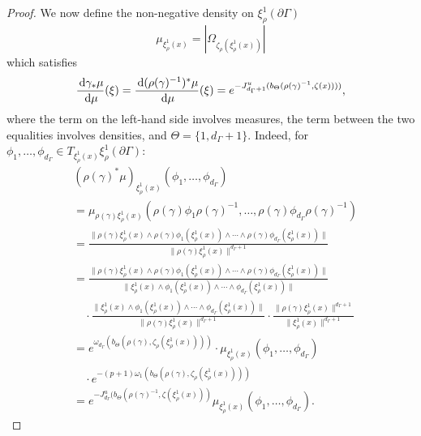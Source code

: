 \documentclass{report}
\begin{document}
\begin{proof}
    We now define the non-negative density on $\xi_\rho^1(\partial \Gamma)$
    \[
        \mu_{\xi_\rho^1(x)} = |\Omega_{\zeta_\rho(\xi_\rho^1(x))}|
    \]
    which satisfies
    \[
        \frac{\,\mathrm{d} \gamma_*\mu}{\,\mathrm{d}\mu}(\xi) = \frac{\,\mathrm{d} (\rho(\gamma)^{-1})^*\mu}{\,\mathrm{d}\mu}(\xi) =
        e^{-J^u_{d_\Gamma + 1}(b_\Theta(\rho(\gamma)^{-1}, \zeta(x))))},
    \]
    where the term on the left-hand side involves measures, the term between the two equalities involves densities, and $\Theta = \{1, d_\Gamma + 1\}$.
    Indeed, for $\phi_1, \ldots, \phi_{d_\Gamma} \in T_{\xi_\rho^1(x)}\xi_\rho^1(\partial \Gamma)$:
    \begin{align*}
        &(\rho(\gamma)^*\mu)_{\xi_\rho^1(x)} (\phi_1, \ldots, \phi_{d_\Gamma})\\
        &=
        \mu_{\rho(\gamma)\xi_\rho^1(x)} (\rho(\gamma)\phi_1\rho(\gamma)^{-1}, \ldots, \rho(\gamma)\phi_{d_\Gamma} \rho(\gamma)^{-1}) \\
        &=
        \frac{\|\rho(\gamma) \xi_\rho^1(x) \wedge \rho(\gamma) \phi_1(\xi_\rho^1(x)) \wedge \cdots \wedge \rho(\gamma) \phi_{d_\Gamma}(\xi_\rho^1(x))\|}
        {\| \rho(\gamma) \xi_\rho^1(x) \|^{d_\Gamma + 1}} \\
        &=
        \frac{\|\rho(\gamma) \xi_\rho^1(x) \wedge \rho(\gamma) \phi_1(\xi_\rho^1(x)) \wedge \cdots \wedge \rho(\gamma) \phi_{d_\Gamma}(\xi_\rho^1(x))\|}
        {\|\xi_\rho^1(x) \wedge \phi_1(\xi_\rho^1(x)) \wedge \cdots \wedge \phi_{d_\Gamma}(\xi_\rho^1(x))\|} \\
        &\quad \cdot
        \frac{\|\xi_\rho^1(x) \wedge \phi_1(\xi_\rho^1(x)) \wedge \cdots \wedge \phi_{d_\Gamma}(\xi_\rho^1(x))\|}
        {\|\rho(\gamma) \xi_\rho^1(x)\|^{d_\Gamma+1}}\cdot
        \frac{\| \rho(\gamma)\xi_\rho^1(x)\|^{d_\Gamma+1}}{\|\xi_\rho^1(x)\|^{d_\Gamma+1}} \\
         &=
         e^{\omega_{d_\Gamma}(b_\Theta(\rho(\gamma), \zeta_\rho(\xi_\rho^1(x))))} \cdot
         \mu_{\xi_\rho^1(x)}(\phi_1, \ldots, \phi_{d_\Gamma}) \\
         &\quad \cdot
         e^{-(p+1)\omega_1(b_\Theta(\rho(\gamma), \zeta_\rho(\xi_\rho^1(x))))} \\
         &=
         e^{-J_{d_\Gamma}^u(b_\Theta(\rho(\gamma)^{-1}, \zeta(\xi_\rho^1(x)))} \mu_{\xi_\rho^1(x)}(\phi_1, \ldots, \phi_{d_\Gamma}).
    \end{align*}
    

\end{proof}
\end{document}
